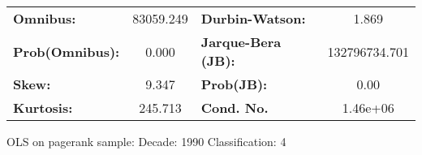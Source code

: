 \begin{center}
\begin{tabular}{lccccc}
\bottomrule
\end{tabular}
\begin{tabular}{lclc}
\textbf{Omnibus:}       & 83059.249 & \textbf{  Durbin-Watson:     } &       1.869    \\
\textbf{Prob(Omnibus):} &    0.000  & \textbf{  Jarque-Bera (JB):  } & 132796734.701  \\
\textbf{Skew:}          &    9.347  & \textbf{  Prob(JB):          } &        0.00    \\
\textbf{Kurtosis:}      &  245.713  & \textbf{  Cond. No.          } &    1.46e+06    \\
\bottomrule
\end{tabular}
\end{center}
\break
OLS on pagerank sample: Decade: 1990 Classification: 4
